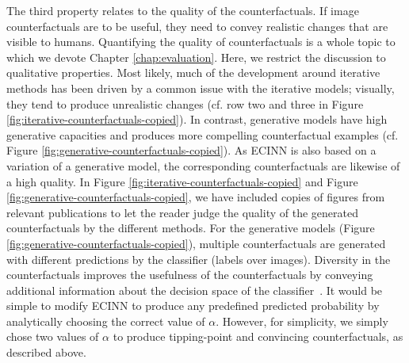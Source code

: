 \documentclass[11pt,a4paper,twoside,openright,final]{memoir}
\begin{document}
The third property relates to the quality of the counterfactuals.
If image counterfactuals are to be useful, they need to convey realistic changes that are visible to humans.
Quantifying the quality of counterfactuals is a whole topic to which we devote Chapter \ref{chap:evaluation}.
Here, we restrict the discussion to qualitative properties.
Most likely, much of the development around iterative methods has been driven by a common issue with the iterative models; visually, they tend to produce unrealistic changes (cf. row two and three in Figure \ref{fig:iterative-counterfactuals-copied}).
In contrast, generative models have high generative capacities and produces more compelling counterfactual examples (cf. Figure \ref{fig:generative-counterfactuals-copied}).
As ECINN is also based on a variation of a generative model, the corresponding counterfactuals are likewise of a high quality.
In Figure \ref{fig:iterative-counterfactuals-copied} and Figure \ref{fig:generative-counterfactuals-copied}, we have included copies of figures from relevant publications to let the reader judge the quality of the generated counterfactuals by the different methods.
For the generative models (Figure \ref{fig:generative-counterfactuals-copied}), multiple counterfactuals are generated with different predictions by the classifier (labels over images).
Diversity in the counterfactuals improves the usefulness of the counterfactuals by conveying additional information about the decision space of the classifier~\cite{Rodriguez2021}.
It would be simple to modify ECINN to produce any predefined predicted probability by analytically choosing the correct value of $\alpha$.
However, for simplicity, we simply chose two values of $\alpha$ to produce tipping-point and convincing counterfactuals, as described above.
\end{document}
